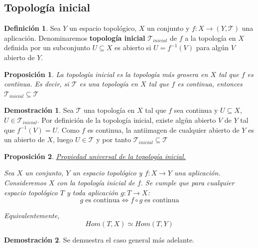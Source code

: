 \documentclass[12pt,twoside]{report}
\newcommand\mc[1]{\mathcal{#1}}
\theoremstyle{azul}
\theoremstyle{azul2}
\theoremstyle{plain}
\newtheorem*{prop}{Proposición}
\theoremstyle{definition}
\newtheorem*{defi}{Definición}
\newtheorem*{dem}{Demostración}
\theoremstyle{remark}
\begin{document}
\subsection{Topología inicial} \label{sec:topi}
\begin{defi}
Sea $Y$ un espacio topológico, $X$ un conjunto y $f: X \longrightarrow (Y, \mc{T})$ una aplicación. Denominaremos \textbf{topología inicial} $\mc{T}_{inicial}$ de $f$  a la  topología en $X$ definida por un subconjunto $U \subseteq X$ es abierto si $U=f^{-1}(V)$ para alg{\'u}n $V$ abierto de $Y$.
\end{defi}
\begin{prop}
La topología inicial es la topología más grosera en $X$ tal que $f$ es continua. Es decir, si $\mc{T}$ es una topología en $X$ tal que $f$ es continua, entonces $\mc{T}_{inicial}\subseteq\mc{T}$
\end{prop}
\begin{dem}
Sea $\mc{T}$ una topología en $X$ tal que $f$ sea continua y $U\subseteq X$, $U\in \mc{T}_{inicial}$. Por definición de la topología inicial, existe algún abierto $V$ de $Y$ tal que $f^{-1}(V)=U$. Como $f$ es continua, la antiimagen de cualquier abierto de $Y$ es un abierto de $X$, luego $U\in\mc{T}$ y por tanto $\mc{T}_{inicial}\subseteq\mc{T}$ 
\end{dem}


\begin{prop} \underline{Propiedad universal de la topología inicial.}

Sea $X$ un conjunto, $Y$ un espacio topológico y $f:X \longrightarrow Y$ una aplicación. Consideremos $X$ con la topología inicial de $f$. Se cumple que para cualquier espacio topológico $T$ y toda aplicación $g:T\longrightarrow X$:
$$g \; \text{es continua} \iff f\circ g\;\text{es continua}$$

Equivalentemente, 
$$Hom(T,X) \simeq Hom (T,Y)$$
\end{prop} 
\begin{dem}
Se demuestra el caso general más adelante.
\end{dem}
\end{document}
